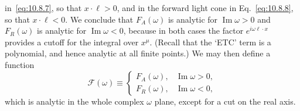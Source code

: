 in~\eqref{eq:10.8.7}, so that $x\cdot\ell>0$, and in the forward light cone
in Eq.~\eqref{eq:10.8.8}, so that $x\cdot\ell<0$. We conclude that
$F_A(\omega)$ is analytic for $\operatorname{Im}\omega>0$ and $F_R(\omega)$
is analytic for $\operatorname{Im}\omega<0$, because in both cases the factor
$e^{i\omega\ell\cdot x}$ provides a cutoff for the integral over $x^\mu$.
(Recall that the `ETC' term is a polynomial, and hence analytic at all finite
points.) We may then define a function
\begin{equation}
  \mathcal F(\omega)\equiv
  \begin{cases}
    F_A(\omega),&\operatorname{Im}\omega>0,\\
    F_R(\omega),&\operatorname{Im}\omega<0,
  \end{cases}
  \tag{10.8.11}\label{eq:10.8.11}
\end{equation}
which is analytic in the whole complex $\omega$ plane, except for a cut on
the real axis.

